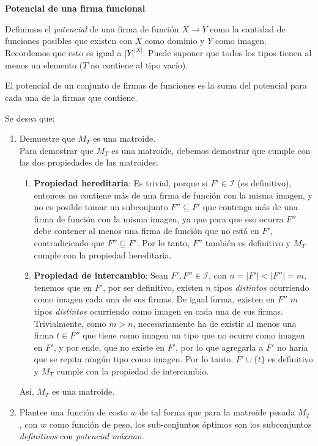 \documentclass[letterpaper, 12pt]{article}
\begin{document}
\begin{enumerate}
\textbf{Potencial de una firma funcional}

Definimos el \emph{potencial} de una firma de función $X \rightarrow Y$ como la cantidad de funciones posibles que existen con $X$ como dominio y $Y$ como imagen. Recordemos que esto es igual a $|Y|^{|X|}$. Puede suponer que todos los tipos tienen al menos un elemento ($T$ no contiene al tipo vacío).

El potencial de un conjunto de firmas de funciones es la suma del potencial para cada una de la firmas que contiene.

Se desea que:

\begin{enumerate}
    \item Demuestre que $M_T$ es una matroide. \\

    Para demostrar que $M_T$ es una matroide, debemos demostrar que cumple con las dos propiedades de las matroides:

    \begin{enumerate}
        \item \textbf{Propiedad hereditaria}: Es trivial, porque si $F' \in \mathcal{I}$ (es definitivo), entonces no contiene más de una firma de función con la misma imagen, y no es posible tomar un subconjunto $F'' \subseteq F'$ que contenga más de una firma de función con la misma imagen, ya que para que eso ocurra $F''$ debe contener al menos una firma de función que no está en $F'$, contradiciendo que $F'' \subseteq F'$. Por lo tanto, $F''$ también es definitivo y $M_T$ cumple con la propiedad hereditaria.
        \item \textbf{Propiedad de intercambio}: Sean $F', F'' \in \mathcal{I}$, con $n=|F'| < |F''| = m$, tenemos que en $F'$, por ser definitivo, existen $n$ tipos \emph{distintos} ocurriendo como imagen cada una de sus firmas. De igual forma, existen en $F''$ $m$ tipos \emph{distintos} ocurriendo como imagen en cada una de sus firmas. Trivialmente, como $m > n$, necesariamente ha de existir al menos una firma $t \in F''$ que tiene como imagen un tipo que no ocurre como imagen en $F'$, y por ende, que no existe en $F'$, por lo que agregarla a $F'$ no haría que se repita ningún tipo como imagen. Por lo tanto, $F' \cup \{t\}$ es definitivo y $M_T$ cumple con la propiedad de intercambio.
    \end{enumerate}

    Así, $M_T$ es una matroide. \\

    \item Plantee una función de costo $w$ de tal forma que para la matroide pesada $M_T$ , con $w$ como función de peso, los sub-conjuntos óptimos son los subconjuntos \emph{definitivos} con \emph{potencial máximo}. \\


\end{enumerate}
\end{enumerate}
\end{document}
